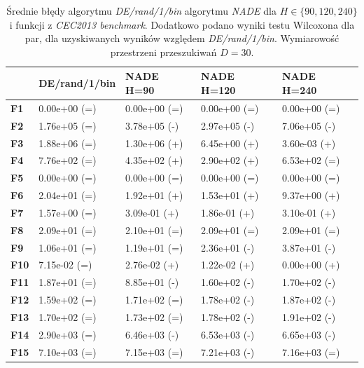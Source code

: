 \documentclass[12pt,a4paper]{report}
\begin{document}
{{{{{{{\begin{table}[h]
\centering
\caption{Średnie błędy algorytmu \emph{DE/rand/1/bin} algorytmu \emph{NADE} dla $H \in \{90, 120, 240\}$ i funkcji z \emph{CEC2013 benchmark}. Dodatkowo podano wyniki testu Wilcoxona dla par, dla uzyskiwanych wyników względem \emph{DE/rand/1/bin}. Wymiarowość przestrzeni przeszukiwań $D = 30$.}
\label{Eksp2}
\begin{tabular}{|l|l|l|l|l|}
\hline
{\bf }    & {\bf DE/rand/1/bin} & {\bf NADE H=90} & {\bf NADE H=120} & {\bf NADE H=240} \\ \hline
{\bf F1}  & 0.00e+00 (=)        & 0.00e+00 (=)    & 0.00e+00 (=)     & 0.00e+00 (=)     \\ \hline
{\bf F2}  & 1.76e+05 (=)        & 3.78e+05 (-)    & 2.97e+05 (-)     & 7.06e+05 (-)     \\ \hline
{\bf F3}  & 1.88e+06 (=)        & 1.30e+06 (+)    & 6.45e+00 (+)     & 3.60e-03 (+)     \\ \hline
{\bf F4}  & 7.76e+02 (=)        & 4.35e+02 (+)    & 2.90e+02 (+)     & 6.53e+02 (=)     \\ \hline
{\bf F5}  & 0.00e+00 (=)        & 0.00e+00 (=)    & 0.00e+00 (=)     & 0.00e+00 (=)     \\ \hline
{\bf F6}  & 2.04e+01 (=)        & 1.92e+01 (+)    & 1.53e+01 (+)     & 9.37e+00 (+)     \\ \hline
{\bf F7}  & 1.57e+00 (=)        & 3.09e-01 (+)    & 1.86e-01 (+)     & 3.10e-01 (+)     \\ \hline
{\bf F8}  & 2.09e+01 (=)        & 2.10e+01 (=)    & 2.09e+01 (=)     & 2.09e+01 (=)     \\ \hline
{\bf F9}  & 1.06e+01 (=)        & 1.19e+01 (=)    & 2.36e+01 (-)     & 3.87e+01 (-)     \\ \hline
{\bf F10} & 7.15e-02 (=)        & 2.76e-02 (+)    & 1.22e-02 (+)     & 0.00e+00 (+)     \\ \hline
{\bf F11} & 1.87e+01 (=)        & 8.85e+01 (-)    & 1.60e+02 (-)     & 1.70e+02 (-)     \\ \hline
{\bf F12} & 1.59e+02 (=)        & 1.71e+02 (=)    & 1.78e+02 (-)     & 1.87e+02 (-)     \\ \hline
{\bf F13} & 1.70e+02 (=)        & 1.73e+02 (=)    & 1.78e+02 (-)     & 1.91e+02 (-)     \\ \hline
{\bf F14} & 2.90e+03 (=)        & 6.46e+03 (-)    & 6.53e+03 (-)     & 6.65e+03 (-)     \\ \hline
{\bf F15} & 7.10e+03 (=)        & 7.15e+03 (=)    & 7.21e+03 (-)     & 7.16e+03 (=)     \\ \hline

\end{tabular}
\end{table}}}}}}}}
\end{document}
